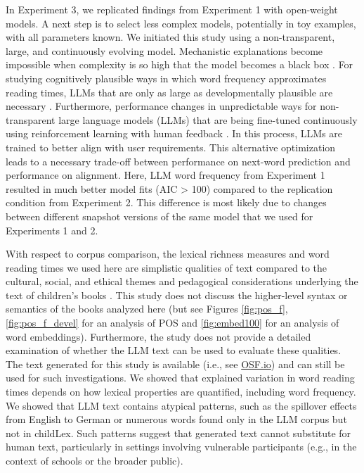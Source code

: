 \documentclass[manuscript]{stjour}
\begin{document}
In Experiment 3, we replicated findings from Experiment 1 with open-weight models. A next step is to select less complex models, potentially in toy examples, with all parameters known. We initiated this study using a non-transparent, large, and continuously evolving model. Mechanistic explanations become impossible when complexity is so high that the model becomes a black box \citep{bender_dangers_2021}. For studying cognitively plausible ways in which word frequency approximates reading times, LLMs that are only as large as developmentally plausible are necessary \citep[see][for recent work in this direction]{feng_is_2024, tan_devbench_2024, hu_auxiliary_2024}. Furthermore, performance changes in unpredictable ways for non-transparent large language models (LLMs) that are being fine-tuned continuously using reinforcement learning with human feedback  \citep[RLHF][]{bai_training_2022, chung_scaling_2024, perez_red_2022, ziegler_fine-tuning_2020}. In this process, LLMs are trained to better align with user requirements. This alternative optimization leads to a necessary trade-off between performance on next-word prediction and performance on alignment. Here, LLM word frequency from Experiment 1 resulted in much better model fits (AIC > 100) compared to the replication condition from Experiment 2. This difference is most likely due to changes between different snapshot versions of the same model that we used for Experiments 1 and 2.   

With respect to corpus comparison, the lexical richness measures and word reading times we used here are simplistic qualities of text compared to the cultural, social, and ethical themes and pedagogical considerations underlying the text of children's books \citep[see e.g.][]{korochkina_morphology_2025}. This study does not discuss the higher-level syntax or semantics of the books analyzed here (but see Figures \ref{fig:pos_f}, \ref{fig:pos_f_devel} for an analysis of POS and \ref{fig:embed100} for an analysis of word embeddings). Furthermore, the study does not provide a detailed examination of whether the LLM text can be used to evaluate these qualities. The text generated for this study is available (i.e., see \href{dx.doi.org/10.17605/OSF.IO/WMUVJ}{OSF.io}) and can still be used for such investigations. We showed that explained variation in word reading times depends on how lexical properties are quantified, including word frequency. We showed that LLM text contains atypical patterns, such as the spillover effects from English to German or numerous words found only in the LLM corpus but not in childLex. Such patterns suggest that generated text cannot substitute for human text, particularly in settings involving vulnerable participants (e.g., in the context of schools or the broader public). 
\end{document}
